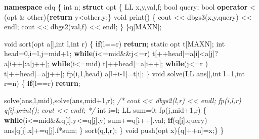 \documentclass[
]{article}
\newenvironment{Shaded}{}{}
\newcommand{\AttributeTok}[1]{\textcolor[rgb]{0.49,0.56,0.16}{#1}}
\newcommand{\CommentTok}[1]{\textcolor[rgb]{0.38,0.63,0.69}{\textit{#1}}}
\newcommand{\ControlFlowTok}[1]{\textcolor[rgb]{0.00,0.44,0.13}{\textbf{#1}}}
\newcommand{\DataTypeTok}[1]{\textcolor[rgb]{0.56,0.13,0.00}{#1}}
\newcommand{\DecValTok}[1]{\textcolor[rgb]{0.25,0.63,0.44}{#1}}
\newcommand{\KeywordTok}[1]{\textcolor[rgb]{0.00,0.44,0.13}{\textbf{#1}}}
\newcommand{\NormalTok}[1]{#1}
\begin{document}
\begin{Shaded}
\begin{Highlighting}[]
\KeywordTok{namespace}\NormalTok{ cdq}
\NormalTok{\{}
    \DataTypeTok{int}\NormalTok{ n;}
    \KeywordTok{struct}\NormalTok{ opt}
\NormalTok{    \{}
\NormalTok{        LL x,y,val,f;}
        \DataTypeTok{bool}\NormalTok{ query;}
        \DataTypeTok{bool} \KeywordTok{operator}\NormalTok{ \textless{} (opt \& other)\{}\ControlFlowTok{return}\NormalTok{ y\textless{}other.y;\}}
        \DataTypeTok{void}\NormalTok{ print()}
\NormalTok{        \{}
\NormalTok{            cout \textless{}\textless{} dbgs3(x,y,query) \textless{}\textless{} endl;}
\NormalTok{            cout \textless{}\textless{} dbgs2(val,f) \textless{}\textless{} endl;}
\NormalTok{        \}}
\NormalTok{    \}q[MAXN];}

    \DataTypeTok{void}\NormalTok{ sort(opt a[],}\DataTypeTok{int}\NormalTok{ l,}\DataTypeTok{int}\NormalTok{ r)}
\NormalTok{    \{}
        \ControlFlowTok{if}\NormalTok{(l==r) }\ControlFlowTok{return}\NormalTok{;}
        \AttributeTok{static}\NormalTok{ opt t[MAXN];}
        \DataTypeTok{int}\NormalTok{ head=}\DecValTok{0}\NormalTok{,i=l,j=mid+}\DecValTok{1}\NormalTok{;}
        \ControlFlowTok{while}\NormalTok{(i\textless{}=mid\&\&j\textless{}=r) t[++head]=a[i]\textless{}a[j]?a[i++]:a[j++];}
        \ControlFlowTok{while}\NormalTok{(i\textless{}=mid) t[++head]=a[i++];}
        \ControlFlowTok{while}\NormalTok{(j\textless{}=r  ) t[++head]=a[j++];}
\NormalTok{        fp(i,}\DecValTok{1}\NormalTok{,head) a[l+i{-}}\DecValTok{1}\NormalTok{]=t[i];}
\NormalTok{    \}}
    \DataTypeTok{void}\NormalTok{ solve(LL ans[],}\DataTypeTok{int}\NormalTok{ l=}\DecValTok{1}\NormalTok{,}\DataTypeTok{int}\NormalTok{ r=n)}
\NormalTok{    \{}
        \ControlFlowTok{if}\NormalTok{(l==r) }\ControlFlowTok{return}\NormalTok{;}

\NormalTok{        solve(ans,l,mid),solve(ans,mid+}\DecValTok{1}\NormalTok{,r);}
\CommentTok{/*}
\CommentTok{        cout \textless{}\textless{} dbgs2(l,r) \textless{}\textless{} endl;}
\CommentTok{        fp(i,l,r) q[i].print();}
\CommentTok{        cout \textless{}\textless{} endl;}
\CommentTok{*/}
        \DataTypeTok{int}\NormalTok{ i=l;}
\NormalTok{        LL sum=}\DecValTok{0}\NormalTok{;}
\NormalTok{        fp(j,mid+}\DecValTok{1}\NormalTok{,r)}
\NormalTok{        \{}
            \ControlFlowTok{while}\NormalTok{(i\textless{}=mid\&\&q[i].y\textless{}=q[j].y)}
\NormalTok{                sum+=q[i++].val;}
            \ControlFlowTok{if}\NormalTok{(q[j].query) ans[q[j].x]+=q[j].f*sum;}
\NormalTok{        \}}
\NormalTok{        sort(q,l,r);}
\NormalTok{    \}}
    \DataTypeTok{void}\NormalTok{ push(opt x)\{q[++n]=x;\}}
\NormalTok{\}}


\end{Highlighting}
\end{Shaded}
\end{document}

